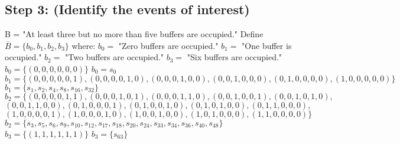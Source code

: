 \documentclass[a4paper,10pt]{article}
\begin{document}
\subsection{Step 3: (Identify the events of interest)}
B = "At least three but no more than five buffers are occupied." \newline
Define $ \overline{B} = \{b_{0}, b_{1}, b_{2}, b_{3}\} $ where: \newline
$ b_{0} = $ "Zero buffers are occupied." \newline
$ b_{1} = $ "One buffer is occupied." \newline
$ b_{2} = $ "Two buffers are occupied." \newline
$ b_{3} = $ "Six buffers are occupied." \newline
$ b_{0} = \{(0,0,0,0,0,0)\} $ \newline
$ b_{0} = s_{0} $ \newline
$ b_{1} = \{(0,0,0,0,0,1),(0,0,0,0,1,0),(0,0,0,1,0,0),(0,0,1,0,0,0),(0,1,0,0,0,0),(1,0,0,0,0,0)\} $ \newline
$ b_{1} = \{s_{1}, s_{2}, s_{4}, s_{8}, s_{16}, s_{32}\} $ \newline
$ b_{2} = \{(0,0,0,0,1,1),(0,0,0,1,0,1),(0,0,0,1,1,0),(0,0,1,0,0,1),(0,0,1,0,1,0), $ \newline
$ (0,0,1,1,0,0),(0,1,0,0,0,1),(0,1,0,0,1,0),(0,1,0,1,0,0),(0,1,1,0,0,0), $ \newline
$ (1,0,0,0,0,1),(1,0,0,0,1,0),(1,0,0,1,0,0),(1,0,1,0,0,0),(1,1,0,0,0,0)\} $ \newline
$ b_{2} = \{s_{3}, s_{5}, s_{6}, s_{9}, s_{10}, s_{12}, s_{17}, s_{18}, s_{20}, s_{24}, s_{33}, s_{34}, s_{36}, 
s_{40}, s_{48}\} $ \newline
$ b_{3} = \{(1,1,1,1,1,1)\} $ \newline
$ b_{3} = \{s_{63}\} $
\end{document}
